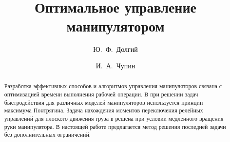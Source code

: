 

\usepackage[russian]{nla}

%
%


%




%
\fi

\title{Оптимальное управление манипулятором}
\author{Ю.~Ф.~Долгий  
  \and  %
  И.~А.~Чупин 
} %


\maketitle

\begin{abstract}
Разработка эффективных способов и алгоритмов управления манипуляторов связана с оптимизацией времени выполнения рабочей операции. В \cite{Chernousko} при решении задач быстродействия для различных моделей манипуляторов используется принцип максимума Понтрягина. Задача нахождения моментов переключения релейных управлений для плоского движения груза в \cite{Akulenko} решена при условии медленного вращения руки манипулятора. В настоящей работе предлагается метод решения последней задачи без дополнительных ограничений.

\end{abstract}

